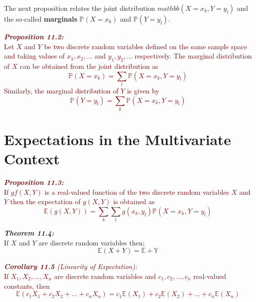 \documentclass{report}
\newenvironment{cframed2}[1][PineGreen]
  {\begin{tcolorbox}[colframe=#1,colback=white]}
  {\end{tcolorbox}}
\newenvironment{cframedprop}[1][Maroon]
  {\begin{tcolorbox}[colframe=#1,colback=white]}
  {\end{tcolorbox}}
\begin{document}
The next proposition relates the joint distribution $mathbb(X = x_k, Y = y_l)$ and the so-called \textbf{marginals} $\mathbb{P}(X = x_k)$ and $\mathbb{P}(Y = y_l)$.

\begin{cframedprop}
    \textcolor{Maroon}{\textbf{\textit{Proposition 11.2:}}\\
    Let $X$ and $Y$ be two discrete random variables defined on the same sample space and taking values of $x_1,x_2,...$ and $y_1,y_2,...$ respectively. The marginal distribution of $X$ can be obtained from the joint distribution as
    \begin{equation}
        \mathbb{P}(X = x_k) = \sum_l \mathbb{P} (X = x_k, Y = y_l)
    \end{equation}
    Similarly, the marginal distribution of $Y$ is given by
    \begin{equation}
        \mathbb{P}(Y = y_l) = \sum_k \mathbb{P}(X = x_k, Y = y_l)
    \end{equation}}
\end{cframedprop}

\section{Expectations in the Multivariate Context}

\begin{cframedprop}
    \textcolor{Maroon}{\textbf{\textit{Proposition 11.3:}}\\
    If $gf(X,Y)$ is a real-valued function of the two discrete random variables $X$ and $Y$ then the expectation of $g(X,Y)$ is obtained as
    \begin{equation}
        \mathbb{E}(g(X,Y)) = \sum_k \sum_l g(x_k, y_l) \mathbb{P}(X = x_k, Y = y_l)
    \end{equation}}
\end{cframedprop}

\begin{cframed2}
    \textcolor{PineGreen}{\textbf{\textit{Theorem 11.4:}}\\
    If $X$ and $Y$ are discrete random variables then;
    \begin{equation}
        \mathbb{E}(X + Y) = \mathbb{E} + \mathbb{Y}
    \end{equation}}
\end{cframed2}

\begin{cframedprop}
    \textcolor{Maroon}{\textit{\textbf{Corollary 11.5} (Linearity of Expectation):}\\
    If $X_1,X_2,...,X_n$ are discrete random variables and $c_1,c_2,...,c_n$ real-valued constants, then
    \begin{equation}
        \mathbb{E}(c_1X_1 + c_2X_2 + ... + c_nX_n) = c_1\mathbb{E}(X_1) + c_2\mathbb{E}(X_2) + ... + c_n\mathbb{E}(X_n)
    \end{equation}}
\end{cframedprop}
\end{document}
